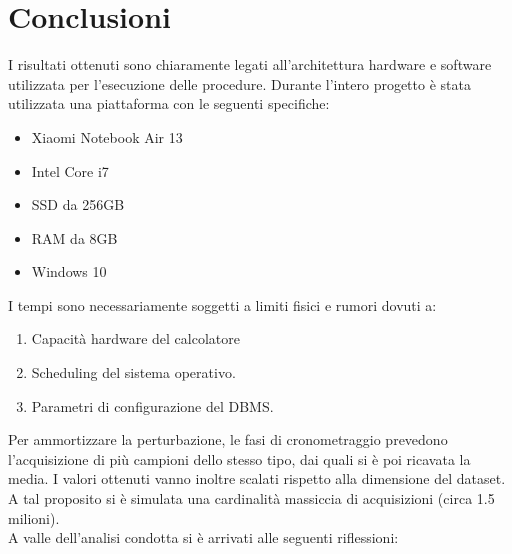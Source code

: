 \chapter{Conclusioni}
I risultati ottenuti sono chiaramente legati all'architettura hardware e software utilizzata per l'esecuzione delle procedure. Durante l'intero progetto è stata utilizzata una piattaforma con le seguenti specifiche:
\begin{itemize}
	\item Xiaomi Notebook Air 13
	\item Intel Core i7
	\item SSD da 256GB
	\item RAM da 8GB
	\item Windows 10
\end{itemize}
I tempi sono necessariamente soggetti a limiti fisici e rumori dovuti a:
\begin{enumerate}
	\item Capacità hardware del calcolatore
	\item Scheduling del sistema operativo.
	\item Parametri di configurazione del DBMS.
\end{enumerate}
Per ammortizzare la perturbazione, le fasi di cronometraggio prevedono l'acquisizione di più campioni dello stesso tipo, dai quali si è poi ricavata la media. I valori ottenuti vanno inoltre scalati rispetto alla dimensione del dataset. A tal proposito si è simulata una cardinalità massiccia di acquisizioni (circa 1.5 milioni).\\
A valle dell’analisi condotta si è arrivati alle seguenti riflessioni:

